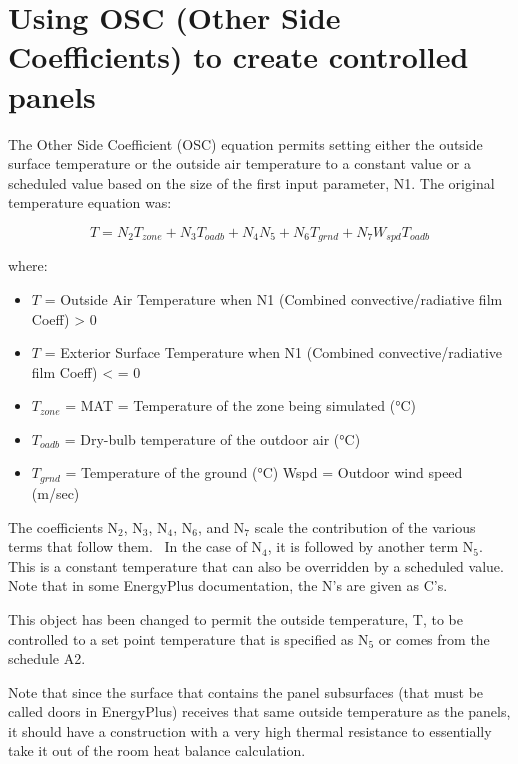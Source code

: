 \section{Using OSC (Other Side Coefficients) to create controlled panels}\label{using-osc-other-side-coefficients-to-create-controlled-panels}

The Other Side Coefficient (OSC) equation permits setting either the outside surface temperature or the outside air temperature to a constant value or a scheduled value based on the size of the first input parameter, N1. The original temperature equation was:

\begin{equation}
T = N_2 T_{zone} + N_3 T_{oadb} + N_4 N_5 + N_6 T_{grnd} + N_7 W_{spd} T_{oadb}
\end{equation}

where:

\begin{itemize}
\item
  \(T\) = Outside Air Temperature when N1 (Combined convective/radiative film Coeff) \textgreater{} 0
\item
  \(T\) = Exterior Surface Temperature when N1 (Combined convective/radiative film Coeff) \textless{} = 0
\item
  \(T_{zone}\) = MAT = Temperature of the zone being simulated (°C)
\item
  \(T_{oadb}\) = Dry-bulb temperature of the outdoor air (°C)
\item
  \(T_{grnd}\) = Temperature of the ground (°C) Wspd = Outdoor wind speed (m/sec)
\end{itemize}

The coefficients N\(_{2}\), N\(_{3}\), N\(_{4}\), N\(_{6}\), and N\(_{7}\) scale the contribution of the various terms that follow them.~ In the case of N\(_{4}\), it is followed by another term N\(_{5}\).~ This is a constant temperature that can also be overridden by a scheduled value. Note that in some EnergyPlus documentation, the N's are given as C's.

This object has been changed to permit the outside temperature, T, to be controlled to a set point temperature that is specified as N\(_{5}\) or comes from the schedule A2.

Note that since the surface that contains the panel subsurfaces (that must be called doors in EnergyPlus) receives that same outside temperature as the panels, it should have a construction with a very high thermal resistance to essentially take it out of the room heat balance calculation.

